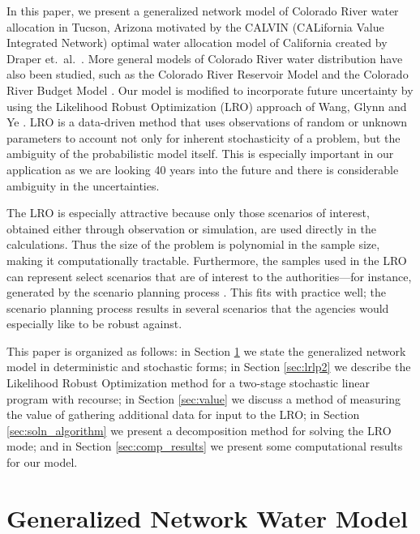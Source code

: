 \documentclass[11pt]{article}
\begin{document}
In this paper, we present a generalized network model of Colorado River water allocation in Tucson, Arizona motivated by the CALVIN (CALifornia Value Integrated Network) optimal water allocation model of California created by Draper et.\ al.\ \cite{draper_etal_03}.  More general models of Colorado River water distribution have also been studied, such as the Colorado River Reservoir Model \cite{christensen2004effects} and the Colorado River Budget Model \cite{barnett2009sustainable}.  Our model is modified to incorporate future uncertainty by using the Likelihood Robust Optimization (LRO) approach of Wang, Glynn and Ye \cite{wang2010likelihood}.  LRO is a data-driven method that uses observations of random or unknown parameters to account not only for inherent stochasticity of a problem, but the ambiguity of the probabilistic model itself.  This is especially important in our application as we are looking 40 years into the future and there is considerable ambiguity in the uncertainties.

The LRO is especially attractive because only those scenarios of interest, obtained either through observation or simulation, are used directly in the calculations.  Thus the size of the problem is polynomial in the sample size, making it computationally tractable.  Furthermore, the samples used in the LRO can represent select scenarios that are of interest to the authorities---for instance, generated by the scenario planning process \cite{cityofTucsonWaterPlan,usbr_11}. This fits with practice well; the scenario planning process results in several scenarios that the agencies would especially like to be robust against.

This paper is organized as follows: in Section \ref{sec:network_model} we state the generalized network model in deterministic and stochastic forms; in Section \ref{sec:lrlp2} we describe the Likelihood Robust Optimization method for a two-stage stochastic linear program with recourse; in Section \ref{sec:value} we discuss a method of measuring the value of gathering additional data for input to the LRO; in Section \ref{sec:soln_algorithm} we present a decomposition method for solving the LRO mode; and in Section \ref{sec:comp_results} we present some computational results for our model.

\section{Generalized Network Water Model} \label{sec:network_model}
\end{document}
